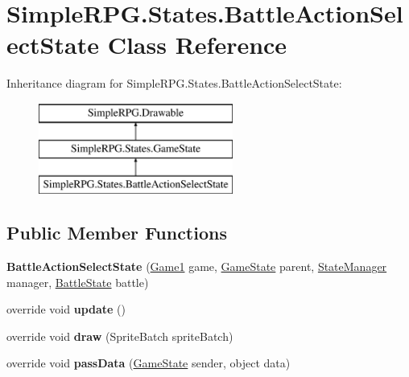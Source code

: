 \hypertarget{class_simple_r_p_g_1_1_states_1_1_battle_action_select_state}{\section{Simple\-R\-P\-G.\-States.\-Battle\-Action\-Select\-State Class Reference}
\label{class_simple_r_p_g_1_1_states_1_1_battle_action_select_state}
}
Inheritance diagram for Simple\-R\-P\-G.\-States.\-Battle\-Action\-Select\-State\-:\begin{figure}[H]
\begin{center}
\leavevmode
\includegraphics[height=3.000000cm]{class_simple_r_p_g_1_1_states_1_1_battle_action_select_state}
\end{center}
\end{figure}
\subsection*{Public Member Functions}
\begin{DoxyCompactItemize}
\item 
\hypertarget{class_simple_r_p_g_1_1_states_1_1_battle_action_select_state_aaa0f9b76c6f824efd3683ce6dccdcde6}{{\bfseries Battle\-Action\-Select\-State} (\hyperlink{class_simple_r_p_g_1_1_game1}{Game1} game, \hyperlink{class_simple_r_p_g_1_1_states_1_1_game_state}{Game\-State} parent, \hyperlink{class_simple_r_p_g_1_1_states_1_1_state_manager}{State\-Manager} manager, \hyperlink{class_simple_r_p_g_1_1_states_1_1_battle_state}{Battle\-State} battle)}\label{class_simple_r_p_g_1_1_states_1_1_battle_action_select_state_aaa0f9b76c6f824efd3683ce6dccdcde6}

\item 
\hypertarget{class_simple_r_p_g_1_1_states_1_1_battle_action_select_state_a1c5d4bbcde130994d834b345cdf1210a}{override void {\bfseries update} ()}\label{class_simple_r_p_g_1_1_states_1_1_battle_action_select_state_a1c5d4bbcde130994d834b345cdf1210a}

\item 
\hypertarget{class_simple_r_p_g_1_1_states_1_1_battle_action_select_state_a4e73b93f17d6be64765870b3b50987d6}{override void {\bfseries draw} (Sprite\-Batch sprite\-Batch)}\label{class_simple_r_p_g_1_1_states_1_1_battle_action_select_state_a4e73b93f17d6be64765870b3b50987d6}

\item 
\hypertarget{class_simple_r_p_g_1_1_states_1_1_battle_action_select_state_ad1eaf46bf46fedfd8d465e9ad29b0018}{override void {\bfseries pass\-Data} (\hyperlink{class_simple_r_p_g_1_1_states_1_1_game_state}{Game\-State} sender, object data)}\label{class_simple_r_p_g_1_1_states_1_1_battle_action_select_state_ad1eaf46bf46fedfd8d465e9ad29b0018}

\end{DoxyCompactItemize}
